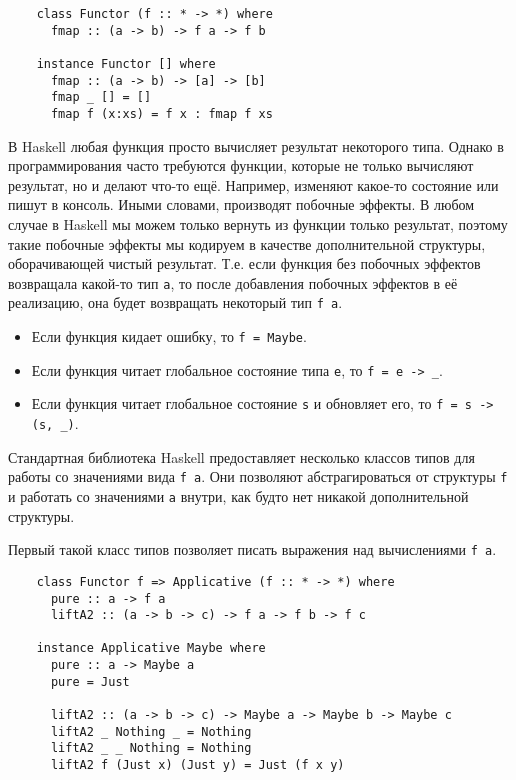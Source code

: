 \begin{verbatim}
    class Functor (f :: * -> *) where
      fmap :: (a -> b) -> f a -> f b

    instance Functor [] where
      fmap :: (a -> b) -> [a] -> [b]
      fmap _ [] = []
      fmap f (x:xs) = f x : fmap f xs
\end{verbatim}

В Haskell любая функция просто вычисляет результат некоторого типа.
Однако в программирования часто требуются функции, которые не только вычисляют результат, но и делают что-то ещё.
Например, изменяют какое-то состояние или пишут в консоль.
Иными словами, производят побочные эффекты.
В любом случае в Haskell мы можем только вернуть из функции только результат, поэтому такие побочные эффекты мы кодируем в качестве дополнительной структуры, оборачивающей чистый результат.
Т.е. если функция без побочных эффектов возвращала какой-то тип \texttt{a}, то после добавления побочных эффектов в её реализацию, она будет возвращать некоторый тип  \texttt{f a}.

\begin{itemize}
    \item Если функция кидает ошибку, то \texttt{f = Maybe}.
    \item Если функция читает глобальное состояние типа \texttt{e}, то \texttt{f = e -> \_}.
    \item Если функция читает глобальное состояние \texttt{s} и обновляет его, то \texttt{f = s -> (s, \_)}.
\end{itemize}

Стандартная библиотека Haskell предоставляет несколько классов типов для работы со значениями вида \texttt{f a}.
Они позволяют абстрагироваться от структуры \texttt{f} и работать со значениями \texttt{a} внутри, как будто нет никакой дополнительной структуры.

Первый такой класс типов позволяет писать выражения над вычислениями \texttt{f a}.
\begin{verbatim}
    class Functor f => Applicative (f :: * -> *) where
      pure :: a -> f a
      liftA2 :: (a -> b -> c) -> f a -> f b -> f c

    instance Applicative Maybe where
      pure :: a -> Maybe a
      pure = Just

      liftA2 :: (a -> b -> c) -> Maybe a -> Maybe b -> Maybe c
      liftA2 _ Nothing _ = Nothing
      liftA2 _ _ Nothing = Nothing
      liftA2 f (Just x) (Just y) = Just (f x y)
\end{verbatim}

